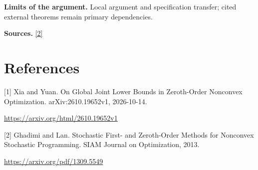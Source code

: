 \documentclass[10pt,a4paper]{article}
\begin{document}
\textbf{Limits of the argument.} Local argument and specification transfer; cited external theorems remain primary dependencies.

\textbf{Sources.} \href{https://arxiv.org/pdf/1309.5549}{[2]}

\section{References}
[1] Xia and Yuan. On Global Joint Lower Bounds in Zeroth-Order Nonconvex Optimization. arXiv:2610.19652v1, 2026-10-14.

\url{https://arxiv.org/html/2610.19652v1}

[2] Ghadimi and Lan. Stochastic First- and Zeroth-Order Methods for Nonconvex Stochastic Programming. SIAM Journal on Optimization, 2013.

\url{https://arxiv.org/pdf/1309.5549}
\end{document}
